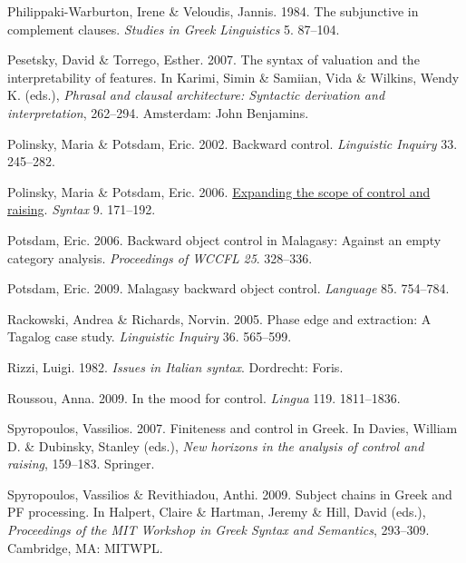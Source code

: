 \documentclass[output=paper]{langsci/langscibook}
\begin{document}
\begin{styleNurTexti}
Philippaki-Warburton, Irene \& Veloudis, Jannis. 1984. The subjunctive in complement clauses. \textit{Studies in Greek Linguistics} 5. 87–104.
\end{styleNurTexti}

Pesetsky, David \& Torrego, Esther. 2007. The syntax of valuation and the interpretability of features. In Karimi, Simin \& Samiian, Vida \& Wilkins, Wendy K. (eds.), \textit{Phrasal and clausal architecture: Syntactic derivation and interpretation}, 262–294. Amsterdam: John Benjamins.

\begin{styleNormalWeb}
Polinsky, Maria \& Potsdam, Eric. 2002. Backward control. \textit{Linguistic Inquiry} 33. 245–282.
\end{styleNormalWeb}

Polinsky, Maria \& Potsdam, Eric. 2006. \href{http://users.clas.ufl.edu/potsdam/papers/Syntax9.pdf}{Expanding the scope of control and raising}. \textit{Syntax} 9. 171–192.

Potsdam, Eric. 2006. Backward object control in Malagasy: Against an empty category analysis. \textit{Proceedings of WCCFL} \textit{25}. 328–336. 

\begin{styleNurTexti}
Potsdam, Eric. 2009. Malagasy backward object control. \textit{Language} 85. 754–784.
\end{styleNurTexti}

Rackowski, Andrea \& Richards, Norvin. 2005. Phase edge and extraction: A Tagalog case study. \textit{Linguistic Inquiry} 36. 565–599.

Rizzi, Luigi. 1982. \textit{Issues in Italian syntax}. Dordrecht: Foris.

Roussou, Anna. 2009. In the mood for control. \textit{Lingua} 119. 1811–1836.

Spyropoulos, Vassilios. 2007. Finiteness and control in Greek. In Davies, William D. \& Dubinsky, Stanley (eds.), \textit{New horizons in the analysis of control and raising}, 159–183. Springer.

\begin{styleNurTexti}
Spyropoulos, Vassilios \& Revithiadou, Anthi. 2009. Subject chains in Greek and PF processing. In Halpert, Claire \& Hartman, Jeremy \& Hill, David (eds.), \textit{Proceedings of the MIT Workshop in Greek Syntax and Semantics}, 293–309. Cambridge, MA: MITWPL.
\end{styleNurTexti}
\end{document}
